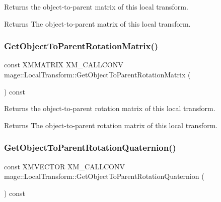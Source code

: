 Returns the object-\/to-\/parent matrix of this local transform.

\begin{DoxyReturn}{Returns}
The object-\/to-\/parent matrix of this local transform. 
\end{DoxyReturn}
\hypertarget{classmage_1_1_local_transform_a43be02da78f59f2e6ab5d5719816498b}{}\label{classmage_1_1_local_transform_a43be02da78f59f2e6ab5d5719816498b} 
\subsubsection{\texorpdfstring{Get\+Object\+To\+Parent\+Rotation\+Matrix()}{GetObjectToParentRotationMatrix()}}
{\footnotesize\ttfamily const X\+M\+M\+A\+T\+R\+IX X\+M\+\_\+\+C\+A\+L\+L\+C\+O\+NV mage\+::\+Local\+Transform\+::\+Get\+Object\+To\+Parent\+Rotation\+Matrix (\begin{DoxyParamCaption}{ }\end{DoxyParamCaption}) const\hspace{0.3cm}{\ttfamily [noexcept]}}

Returns the object-\/to-\/parent rotation matrix of this local transform.

\begin{DoxyReturn}{Returns}
The object-\/to-\/parent rotation matrix of this local transform. 
\end{DoxyReturn}
\hypertarget{classmage_1_1_local_transform_a5d9cb07de3b11b31665f2bb35580febc}{}\label{classmage_1_1_local_transform_a5d9cb07de3b11b31665f2bb35580febc} 
\subsubsection{\texorpdfstring{Get\+Object\+To\+Parent\+Rotation\+Quaternion()}{GetObjectToParentRotationQuaternion()}}
{\footnotesize\ttfamily const X\+M\+V\+E\+C\+T\+OR X\+M\+\_\+\+C\+A\+L\+L\+C\+O\+NV mage\+::\+Local\+Transform\+::\+Get\+Object\+To\+Parent\+Rotation\+Quaternion (\begin{DoxyParamCaption}{ }\end{DoxyParamCaption}) const\hspace{0.3cm}{\ttfamily [noexcept]}}

